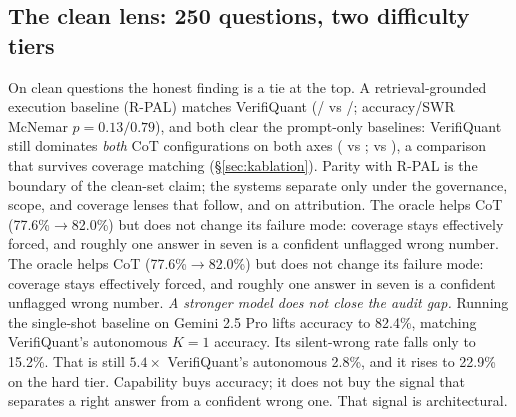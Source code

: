 \subsection{The clean lens: 250 questions, two difficulty tiers}\label{sec:main}
On clean questions the honest finding is a tie at the top.
A retrieval-grounded execution baseline (R-PAL) matches VerifiQuant (\rpalAccAll{}/\rpalSWRAll{} vs \vqAccAll{}/\vqSWRAll{}; accuracy/SWR McNemar $p{=}0.13/0.79$), and both clear the prompt-only baselines: VerifiQuant still dominates \emph{both} CoT configurations on both axes (\vqAccAll{} vs \cotoAccAll{}; \vqSWRAll{} vs \cotoSWRAll{}), a comparison that survives coverage matching (\S\ref{sec:kablation}).
Parity with R-PAL is the boundary of the clean-set claim; the systems separate only under the governance, scope, and coverage lenses that follow, and on attribution.
The oracle helps CoT (77.6\%$\rightarrow$82.0\%) but does not change its failure mode: coverage stays effectively forced, and roughly one answer in seven is a confident unflagged wrong number.
The oracle helps CoT (77.6\%$\rightarrow$82.0\%) but does not change its failure mode: coverage stays effectively forced, and roughly one answer in seven is a confident unflagged wrong number.
\emph{A stronger model does not close the audit gap.} Running the single-shot baseline on Gemini 2.5 Pro lifts accuracy to 82.4\%, matching VerifiQuant's autonomous $K{=}1$ accuracy.
Its silent-wrong rate falls only to 15.2\%.
That is still $5.4\times$ VerifiQuant's autonomous 2.8\%, and it rises to 22.9\% on the hard tier.
Capability buys accuracy; it does not buy the signal that separates a right answer from a confident wrong one.
That signal is architectural.

